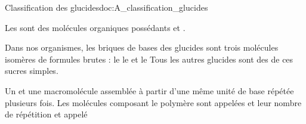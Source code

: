 \tetePremStssBiom
{}

\begin{doc}{Classification des glucides}{doc:A_classification_glucides}
  \begin{importants}
    Les  sont des molécules organiques possédants  et .
  \end{importants}
  Dans nos organismes, les briques de bases des glucides sont trois molécules isomères de formules brutes  : le  le  et le 
  Tous les autres glucides sont des  de ces sucres simples.
  \begin{importants}
    Un  et une macromolécule assemblée à partir d'une même unité de base répétée plusieurs fois.
    Les molécules composant le polymère sont appelées  et leur nombre de répétition et appelé 
  \end{importants}


\end{doc}
